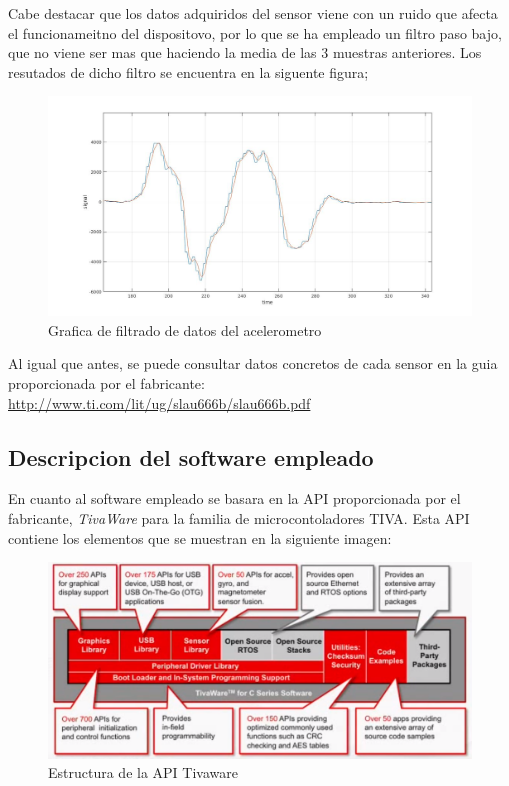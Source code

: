 \documentclass[a4paper,twoside]{article}
\begin{document}
Cabe destacar que los datos adquiridos del sensor viene con un ruido que afecta el funcionameitno del dispositovo, por lo que se ha empleado un filtro paso bajo, que no viene ser mas que haciendo la media de las 3 muestras anteriores. Los resutados de dicho filtro se encuentra en la siguente figura;
\\
 \begin{figure}[h!]
	\centering
	\includegraphics[width=1\textwidth]{../images/filter}
  \caption{Grafica de filtrado de datos del acelerometro}
\end{figure}

Al igual que antes, se puede consultar datos concretos de cada sensor en la guia proporcionada por el fabricante:
\url{http://www.ti.com/lit/ug/slau666b/slau666b.pdf}


\newpage
\subsection{Descripcion del software empleado}
En cuanto al software empleado se basara en la API proporcionada por el fabricante, \textit{TivaWare} para la familia de microcontoladores TIVA. Esta API contiene los elementos que se muestran en la siguiente imagen:\\
\begin{figure}[h!]
 \centering
 \includegraphics[width=.8\textwidth]{../images/tivaware_struct}
 \caption{Estructura de la API Tivaware}
\end{figure}
\end{document}

